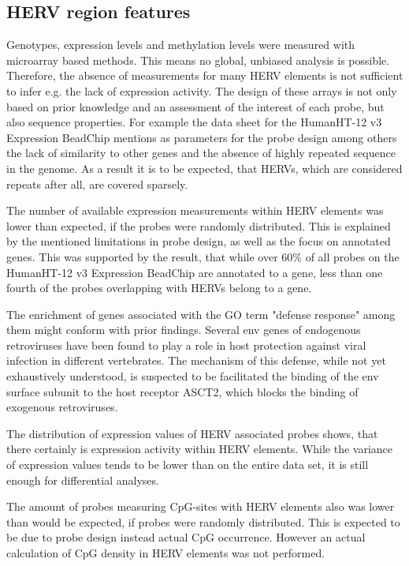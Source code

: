 \documentclass[a4paper,12pt,twoside,openright]{article}
\begin{document}
\subsection{HERV region features}
\label{Discussion:HERV region features}

Genotypes, expression levels and methylation levels were measured with microarray based methods. This means no global, unbiased analysis is possible. Therefore, the absence of measurements for many HERV elements is not sufficient to infer e.g. the lack of expression activity. The design of these arrays is not only based on prior knowledge and an assessment of the interest of each probe, but also sequence properties. For example the data sheet for the HumanHT-12 v3 Expression BeadChip\cite{HumanHT} mentions as parameters for the probe design among others the lack of similarity to other genes and the absence of highly repeated sequence in the genome. As a result it is to be expected, that HERVs, which are considered repeats after all, are covered sparsely. 

The number of available expression measurements within HERV elements was lower than expected, if the probes were randomly distributed. This is explained by the mentioned limitations in probe design, as well as the focus on annotated genes. This was supported by the result, that while over 60\% of all probes on the HumanHT-12 v3 Expression BeadChip are annotated to a gene, less than one fourth of the probes overlapping with HERVs belong to a gene.

The enrichment of genes associated with the GO term "defense response" among them might conform with prior findings. Several env genes of endogenous retroviruses have been found to play a role in host protection against viral infection in different vertebrates\cite{Malfavon-Borja2015}. The mechanism of this defense, while not yet exhaustively understood, is suspected to be facilitated the binding of the env surface subunit to the host receptor ASCT2, which blocks the binding of exogenous retroviruses\cite{Malfavon-Borja2015}. 

The distribution of expression values of HERV associated probes shows, that there certainly is expression activity within HERV elements. While the variance of expression values tends to be lower than on the entire data set, it is still enough for differential analyses. 

The amount of probes measuring CpG-sites with HERV elements also was lower than would be expected, if probes were randomly distributed. This is expected to be due to probe design instead actual CpG occurrence. However an actual calculation of CpG density in HERV elements was not performed. 
\end{document}
